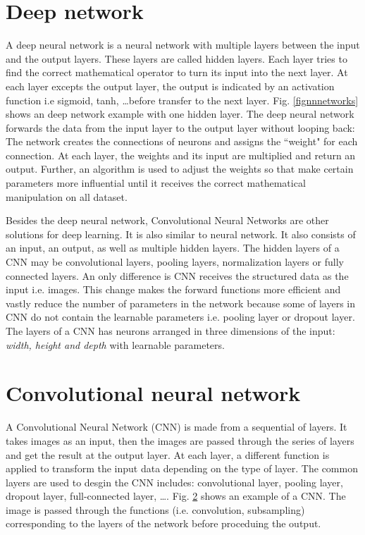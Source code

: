 \section{Deep network}
A deep neural network is a neural network with multiple layers between the input and the output layers. These layers are called hidden layers. Each layer tries to find the correct mathematical operator to turn its input into the next layer. At each layer excepts the output layer, the output is indicated by an activation function i.e sigmoid, tanh, \ldots before transfer to the next layer. Fig. \ref{fignnnetworks} shows an deep network example with one hidden layer. The deep neural network forwards the data from the input layer to the output layer without looping back: The network creates the connections of neurons and assigns the ``weight" for each connection. At each layer, the weights and its input are multiplied and return an output. Further, an algorithm is used to adjust the weights so that make certain parameters more influential until it receives the correct mathematical manipulation on all dataset.

Besides the deep neural network, Convolutional Neural Networks are other solutions for deep learning. It is also similar to neural network. It also consists of an input, an output, as well as multiple hidden layers. The hidden layers of a CNN may be convolutional layers, pooling layers, normalization layers or fully connected layers. An only difference is CNN receives the structured data as the input i.e. images. This change makes the forward functions more efficient and vastly reduce the number of parameters in the network because some of layers in CNN do not contain the learnable parameters i.e. pooling layer or dropout layer. The layers of a CNN has neurons arranged in three dimensions of the input: \textit{width, height and depth} with learnable parameters.

\section{Convolutional neural network}
A Convolutional Neural Network (CNN) is made from a sequential of layers. It takes images as an input, then the images are passed through the series of layers and get the result at the output layer. At each layer, a different function is applied to transform the input data depending on the type of layer. The common layers are used to desgin the CNN includes: convolutional layer, pooling layer, dropout layer, full-connected layer, \ldots. Fig. \ref{} shows an example of a CNN. The image is passed through the functions (i.e. convolution, subsampling) corresponding to the layers of the network before proceduing the output.

